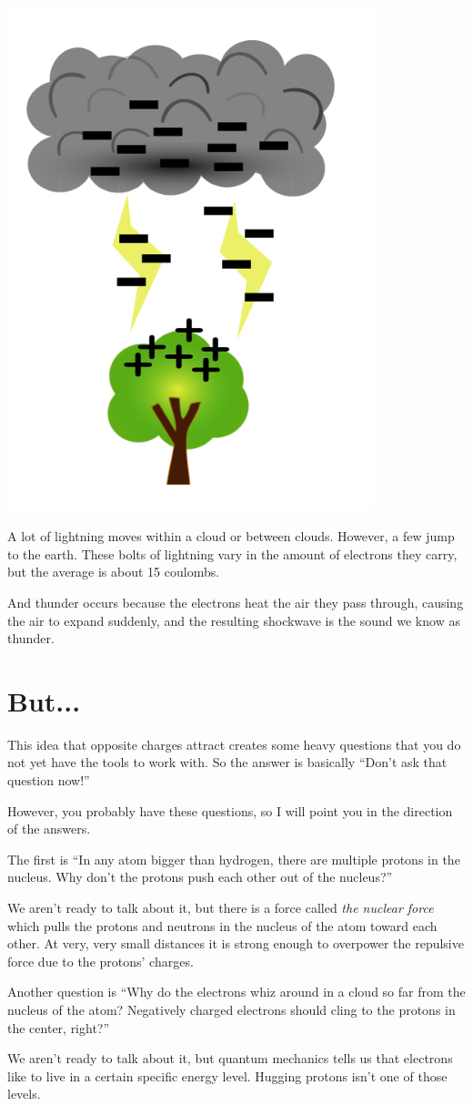 \includegraphics[width=0.8\textwidth]{Lighting_Diagram.png}

A lot of lightning moves within a cloud or between clouds. However, a
few jump to the earth. These bolts of lightning vary in the amount of
electrons they carry, but the average is about 15 coulombs.

And thunder occurs because the electrons heat the air they pass through, 
causing the air to expand suddenly, and the resulting shockwave is the sound we know as thunder.
\section{But...}

This idea that opposite charges attract creates some heavy questions
that you do not yet have the tools to work with. So the answer is
basically ``Don't ask that question now!''

However, you probably have these questions, so I will point you in
the direction of the answers.

The first is ``In any atom bigger than hydrogen, there are multiple
protons in the nucleus. Why don't the protons push each other out of
the nucleus?''

We aren't ready to talk about it, but there is a force called \textit{the
 nuclear force} which pulls the protons and neutrons in the nucleus
of the atom toward each other. At very, very small distances it is
strong enough to overpower the repulsive force due to the protons'
charges.

Another question is ``Why do the electrons whiz around in a cloud so
far from the nucleus of the atom? Negatively charged electrons should
cling to the protons in the center, right?''

We aren't ready to talk about it, but quantum mechanics tells us that
electrons like to live in a certain specific energy level. Hugging
protons isn't one of those levels.
